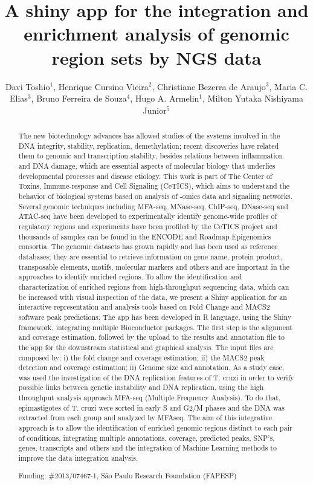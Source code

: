 \documentclass[twoside]{article}
\title{\vspace{-15mm}\fontsize{24pt}{10pt}\selectfont\textbf{A shiny app for the integration and enrichment analysis of genomic region sets by NGS data}} %
\author{Davi Toshio$^1$, Henrique Cursino Vieira$^2$, Christiane Bezerra de Araujo$^3$, Maria C. Elias$^3$, Bruno Ferreira de Souza$^4$, Hugo A. Armelin$^1$, Milton Yutaka Nishiyama Junior$^5$}
\affil{1 INSTITUTO BUTANTAN\\ 2 LECC-CETICS, INSTITUTO BUTANTAN\\ 3 LECC-CETICS, BUTANTAN INSTITUTE\\ 4 ECC-CETICS, INSTITUTO BUTANTAN\\ 5 LETA-CETICS, INSTITUTO BUTANTAN\\ }
\date{}
\begin{document}
\maketitle %

\thispagestyle{fancy} %


\begin{abstract}
The new biotechnology advances has allowed studies of the systems involved in the DNA integrity, stability, replication, demethylation; recent discoveries have related them to genomic and transcription stability, besides relations between inflammation and DNA damage, which are essential aspects of molecular biology that underlies developmental processes and disease etiology. This work is part of The Center of Toxins, Immune-response and Cell Signaling (CeTICS), which aims to understand the behavior of biological systems based on analysis of -omics data and signaling networks. Several genomic techniques including MFA-seq, MNase-seq, ChIP-seq, DNase-seq and ATAC-seq have been developed to experimentally identify genome-wide profiles of regulatory regions and experiments have been profiled by the CeTICS project and thousands of samples can be found in the ENCODE and Roadmap Epigenomics consortia. The genomic datasets has grown rapidly and has been used as reference databases; they are essential to retrieve information on gene name, protein product, transposable elements, motifs, molecular markers and others and are important in the approaches to identify enriched regions. To allow the identification and characterization of enriched regions from high-throughput sequencing data, which can be increased with visual inspection of the data, we present a Shiny application for an interactive representation and analysis tools based on Fold Change and MACS2 software peak predictions. The app has been developed in R language, using the Shiny framework, integrating multiple Bioconductor packages. The first step is the alignment and coverage estimation, followed by the upload to the results and annotation file to the app for the downstream statistical and graphical analysis. The input files are composed by: i) the fold change and coverage estimation; ii) the MACS2 peak detection and coverage estimation; ii) Genome size and annotation. As a study case, was used the investigation of the DNA replication features of T. cruzi in order to verify possible links between genetic instability and DNA replication, using the high throughput analysis approach MFA-seq (Multiple Frequency Analysis). To do that, epimastigotes of T. cruzi were sorted in early S and G2/M phases and the DNA was extracted from each group and analyzed by MFAseq. The aim of this integrative approach is to allow the identification of enriched genomic regions distinct to each pair of conditions, integrating multiple annotations, coverage, predicted peaks, SNP's, genes, transcripts and others and the integration of Machine Learning methods to improve the data integration analysis.

Funding: \#2013/07467-1, S\~ao Paulo Research Foundation (FAPESP)
\end{abstract}
\end{document}
